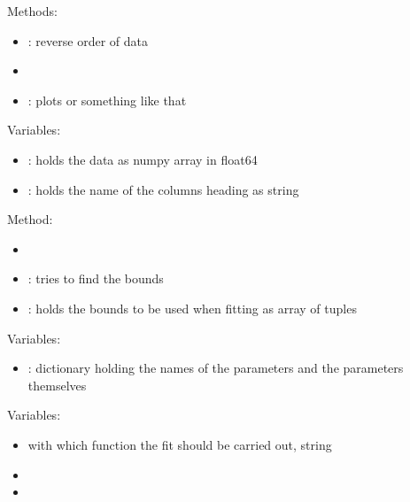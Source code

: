 \documentclass[letterpaper,10pt,english]{sphinxmanual}
\begin{document}

Methods:
\begin{itemize}
\item {} 
: reverse order of data

\item {} 

\item {} 
: plots  or something like that

\end{itemize}

Variables:
\begin{itemize}
\item {} 
: holds the data as numpy array in float64

\item {} 
: holds the name of the columns heading as string

\end{itemize}


Method:
\begin{itemize}
\item {} 

\item {} 
: tries to find the bounds

\item {} 
: holds the bounds to be used when fitting as array of tuples

\end{itemize}

Variables:
\begin{itemize}
\item {} 
: dictionary holding the names of the parameters and the parameters themselves

\end{itemize}


Variables:
\begin{itemize}
\item {} 
 with which function the fit should be carried out, string

\item {} 

\item {} 

\end{itemize}
\end{document}

